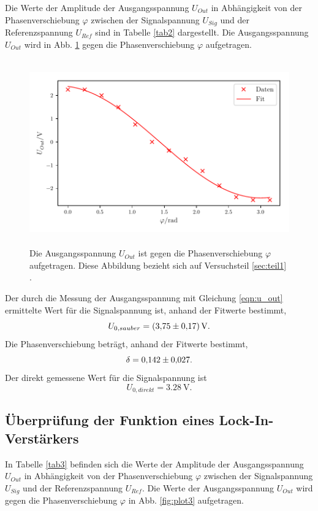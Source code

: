 \noindent Die Werte der Amplitude der Ausgangsspannung $U_{Out}$ in Abhängigkeit von der Phasenverschiebung $\varphi$
zwischen der Signalspannung $U_{Sig}$ und der Referenzspannung $U_{Ref}$
sind in Tabelle \ref{tab2} dargestellt. Die Ausgangsspannung $U_{Out}$ wird in Abb. \ref{fig:plot2} gegen die Phasenverschiebung $\varphi$
aufgetragen.


\begin{figure}
    \centering
    \includegraphics[width=12cm, height=8cm]{build/plot2.pdf}
    \caption{Die Ausgangsspannung $U_{Out}$ ist gegen die Phasenverschiebung $\varphi$ aufgetragen.
    Diese Abbildung bezieht sich auf Versuchsteil \ref{sec:teil1} .}
    \label{fig:plot2}
\end{figure}

\noindent Der durch die Messung der Ausgangsspannung mit Gleichung \eqref{eqn:u_out} ermittelte Wert für die Signalspannung ist, anhand der Fitwerte bestimmt,
\begin{equation*}
    U_{0,sauber} = \SI{3.75 \pm 0.17}{\volt}.
\end{equation*}
\noindent Die Phasenverschiebung beträgt, anhand der Fitwerte bestimmt, 
\begin{equation*}
    \delta = \num{0.142 \pm 0.027}.
\end{equation*}
Der direkt gemessene Wert für die Signalspannung ist
\begin{equation*}
    U_{0,direkt} = \SI{3.28}{\volt}. %
\end{equation*}

\subsection{Überprüfung der Funktion eines Lock-In-Verstärkers}
\label{sec:teil2}
In Tabelle \ref{tab3} befinden sich die Werte der Amplitude der Ausgangsspannung $U_{Out}$ in
Abhängigkeit von der Phasenverschiebung $\varphi$ zwischen der Signalspannung $U_{Sig}$ und
der Referenzspannung $U_{Ref}$. Die Werte der Ausgangsspannung $U_{Out}$ wird gegen die Phasenverschiebung $\varphi$
in Abb. \ref{fig:plot3} aufgetragen.


